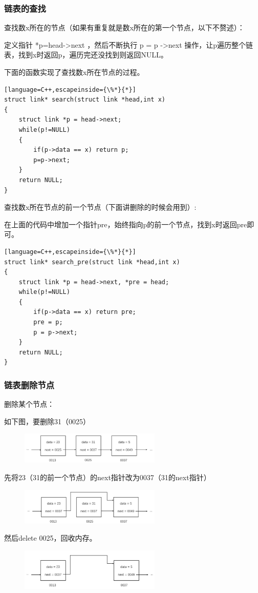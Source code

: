 \documentclass[UTF8]{ctexart}
\begin{document}
\subsubsection{链表的查找}
查找数x所在的节点（如果有重复就是数x所在的第一个节点，以下不赘述）：

定义指针 *p=head->next ，然后不断执行 p = p -\textgreater next 操作，让p遍历整个链表，找到x时返回p，遍历完还没找到则返回NULL。

下面的函数实现了查找数x所在节点的过程。
\begin{lstlisting}[language=C++,escapeinside={\%*}{*}]
struct link* search(struct link *head,int x)
{
	struct link *p = head->next;
	while(p!=NULL)
	{
		if(p->data == x) return p;
		p=p->next;
	}
	return NULL;
}
\end{lstlisting}
查找数x所在节点的前一个节点（下面讲删除的时候会用到）:

在上面的代码中增加一个指针pre，始终指向p的前一个节点，找到x时返回pre即可。
\begin{lstlisting}[language=C++,escapeinside={\%*}{*}]
struct link* search_pre(struct link *head,int x)
{
	struct link *p = head->next, *pre = head;
	while(p!=NULL)
	{
		if(p->data == x) return pre;
		pre = p;
		p = p->next;
	}
	return NULL;
}
\end{lstlisting}
\subsubsection{链表删除节点}
删除某个节点：

如下图，要删除31（0025）
\begin{figure}[H]
	\centering
	\includegraphics[width=0.6\textwidth,keepaspectratio]{picture/8.1.jpg}
\end{figure}
先将23（31的前一个节点）的next指针改为0037（31的next指针）
\begin{figure}[H]
	\centering
	\includegraphics[width=0.6\textwidth,keepaspectratio]{picture/9.1.jpg}
\end{figure}
然后delete 0025，回收内存。
\begin{figure}[H]
	\centering
	\includegraphics[width=0.6\textwidth,keepaspectratio]{picture/10.1.jpg}
\end{figure}
\end{document}
